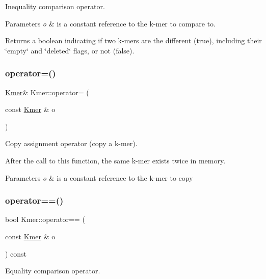 Inequality comparison operator. 


\begin{DoxyParams}{Parameters}
{\em o} & is a constant reference to the k-\/mer to compare to. \\
\hline
\end{DoxyParams}
\begin{DoxyReturn}{Returns}
a boolean indicating if two k-\/mers are the different (true), including their \char`\"{}empty\char`\"{} and \char`\"{}deleted\char`\"{} flags, or not (false). 
\end{DoxyReturn}
\mbox{\label{classKmer_a56dc01450914c70b999ff95893a1df2c}} 
\subsubsection{\texorpdfstring{operator=()}{operator=()}}
{\footnotesize\ttfamily \hyperlink{classKmer}{Kmer}\& Kmer\+::operator= (\begin{DoxyParamCaption}\item[{const \hyperlink{classKmer}{Kmer} \&}]{o }\end{DoxyParamCaption})}



Copy assignment operator (copy a k-\/mer). 

After the call to this function, the same k-\/mer exists twice in memory. 
\begin{DoxyParams}{Parameters}
{\em o} & is a constant reference to the k-\/mer to copy \\
\hline
\end{DoxyParams}
\mbox{\label{classKmer_a7d0f2060f9bda7c9b29a40e1b991ce85}} 
\subsubsection{\texorpdfstring{operator==()}{operator==()}}
{\footnotesize\ttfamily bool Kmer\+::operator== (\begin{DoxyParamCaption}\item[{const \hyperlink{classKmer}{Kmer} \&}]{o }\end{DoxyParamCaption}) const}



Equality comparison operator. 


